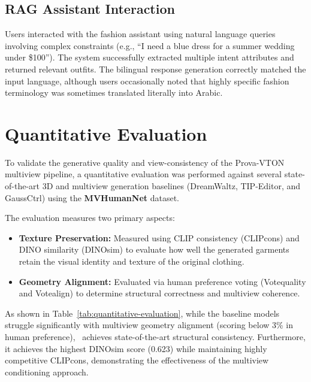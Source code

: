 \subsection{RAG Assistant Interaction}

Users interacted with the fashion assistant using natural language queries involving complex constraints (e.g., ``I need a blue dress for a summer wedding under \$100''). The system successfully extracted multiple intent attributes and returned relevant outfits. The bilingual response generation correctly matched the input language, although users occasionally noted that highly specific fashion terminology was sometimes translated literally into Arabic.

\section{Quantitative Evaluation}
\label{sec:test-quantitative}

To validate the generative quality and view-consistency of the Prova-VTON multiview pipeline, a quantitative evaluation was performed against several state-of-the-art 3D and multiview generation baselines (DreamWaltz, TIP-Editor, and GaussCtrl) using the \textbf{MVHumanNet} dataset. 

The evaluation measures two primary aspects:
\begin{itemize}[leftmargin=*]
    \item \textbf{Texture Preservation:} Measured using CLIP consistency (CLIPcons) and DINO similarity (DINOsim) to evaluate how well the generated garments retain the visual identity and texture of the original clothing.
    \item \textbf{Geometry Alignment:} Evaluated via human preference voting (Votequality and Votealign) to determine structural correctness and multiview coherence.
\end{itemize}

As shown in Table~\ref{tab:quantitative-evaluation}, while the baseline models struggle significantly with multiview geometry alignment (scoring below 3\% in human preference), \projectname\ achieves state-of-the-art structural consistency. Furthermore, it achieves the highest DINOsim score (0.623) while maintaining highly competitive CLIPcons, demonstrating the effectiveness of the multiview conditioning approach.

